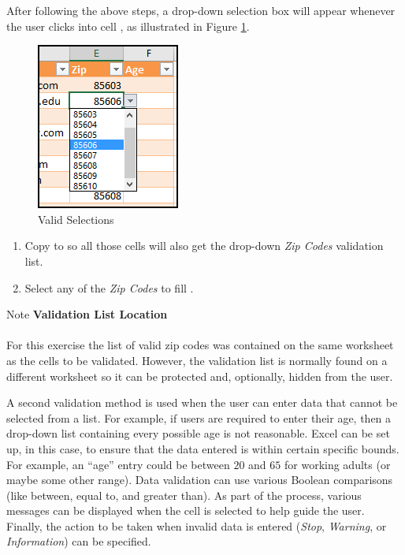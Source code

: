 After following the above steps, a drop-down selection box will appear whenever the user clicks into cell , as illustrated in Figure \ref{07:fig38}. 

\begin{figure}[H]
	\centering
	\includegraphics[width=\maxwidth{.95\linewidth}]{gfx/ch07_fig38}
	\caption{Valid Selections}
	\label{07:fig38}
\end{figure}

\begin{enumbox}
	\begin{enumerate}
		\item Copy  to  so all those cells will also get the drop-down \textit{Zip Codes} validation list.
		\item Select any of the \textit{Zip Codes} to fill .
	\end{enumerate}
\end{enumbox}
	
\begin{center}
	\begin{infobox}{Note}
		\textbf{Validation List Location}
		\\
		\\
		For this exercise the list of valid zip codes was contained on the same worksheet as the cells to be validated. However, the validation list is normally found on a different worksheet so it can be protected and, optionally, hidden from the user.
	\end{infobox}
\end{center}

A second validation method is used when the user can enter data that cannot be selected from a list. For example, if users are required to enter their age, then a drop-down list containing every possible age is not reasonable. Excel can be set up, in this case, to ensure that the data entered is within certain specific bounds. For example, an ``age'' entry could be between $ 20 $ and $ 65 $ for working adults (or maybe some other range). Data validation can use various Boolean comparisons (like between, equal to, and greater than). As part of the process, various messages can be displayed when the cell is selected to help guide the user. Finally, the action to be taken when invalid data is entered (\textit{Stop}, \textit{Warning}, or \textit{Information}) can be specified.

